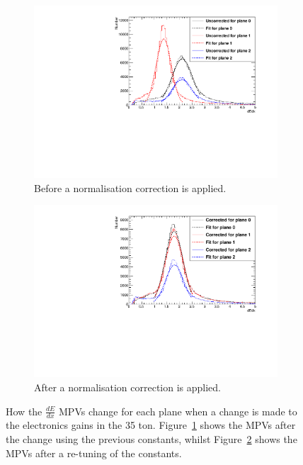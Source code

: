 \begin{figure}[h!]
  \centering
  \begin{subfigure}{0.45\textwidth}
    \centering
    \includegraphics[width=\textwidth]{UnCorrectedCanvas}
    \caption{Before a normalisation correction is applied.}
    \label{fig:CaloTune_Before}
  \end{subfigure}
  \hspace{0.08\textwidth}
  \begin{subfigure}{0.45\textwidth}
    \centering
    \includegraphics[width=\textwidth]{CorrectedCanvas}
    \caption{After a normalisation correction is applied.}
    \label{fig:CaloTune_After}
  \end{subfigure}
  \caption[The tuning of the calorimetric constants in the 35 ton]
          {How the $\frac{dE}{dx}$ MPVs change for each plane when a change is made to the electronics gains in the 35 ton. Figure~\ref{fig:CaloTune_Before} shows the MPVs after the change using the previous constants, whilst Figure~\ref{fig:CaloTune_After} shows the MPVs after a re-tuning of the constants.}
          \label{fig:CaloTune}
\end{figure}
        

